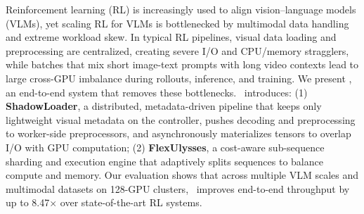 Reinforcement learning (RL) is increasingly used to align vision--language models (VLMs), yet scaling RL for VLMs is bottlenecked by multimodal data handling and extreme workload skew. In typical RL pipelines, visual data loading and preprocessing are centralized, creating severe I/O and CPU/memory stragglers, while batches that mix short image-text prompts with long video contexts lead to large cross-GPU imbalance during rollouts, inference, and training. We present \SysName, an end-to-end system that removes these bottlenecks. \SysName~introduces: (1) \textbf{ShadowLoader}, a distributed, metadata-driven pipeline that keeps only lightweight visual metadata on the controller, pushes decoding and preprocessing to worker-side preprocessors, and asynchronously materializes tensors to overlap I/O with GPU computation; (2) \textbf{FlexUlysses}, a cost-aware sub-sequence sharding and execution engine that adaptively splits sequences to balance compute and memory. Our evaluation shows that across multiple VLM scales and multimodal datasets on 128-GPU clusters, \SysName~improves end-to-end throughput by up to 8.47$\times$ over state-of-the-art RL systems.
